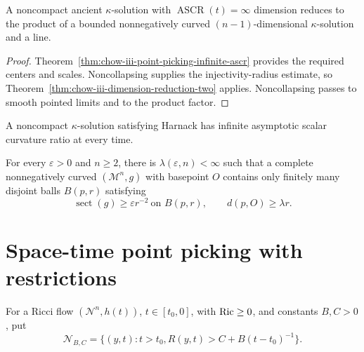 \begin{corollary}
\label{cor:chow-iii-dimension-reduction-kappa-solutions}


A noncompact ancient \(\kappa\)-solution with
\(\operatorname{ASCR}(t)=\infty\) dimension reduces to the product of a
bounded nonnegatively curved \((n-1)\)-dimensional \(\kappa\)-solution and a
line.
\end{corollary}
\begin{proof}
\sketch Theorem~\ref{thm:chow-iii-point-picking-infinite-ascr} provides the required
centers and scales.  Noncollapsing supplies the injectivity-radius estimate,
so Theorem~\ref{thm:chow-iii-dimension-reduction-two} applies.  Noncollapsing
passes to smooth pointed limits and to the product factor.
\end{proof}

\begin{remark}
\label{rem:chow-iii-kappa-solution-harnack-ascr}

A noncompact \(\kappa\)-solution satisfying Harnack has infinite asymptotic
scalar curvature ratio at every time.
\end{remark}

\begin{theorem}
\label{thm:chow-iii-finite-remote-curvature-bumps}

For every \(\varepsilon>0\) and \(n\ge2\), there is
\(\lambda(\varepsilon,n)<\infty\) such that a complete nonnegatively curved
\((\mathcal M^n,g)\) with basepoint \(O\) contains only finitely many disjoint
balls \(B(p,r)\) satisfying
\[
 \operatorname{sect}(g)\ge\varepsilon r^{-2}\ \text{on }B(p,r),
 \qquad d(p,O)\ge\lambda r.
\]
\end{theorem}

\section{Space-time point picking with restrictions}

For a Ricci flow \((\mathcal N^n,h(t))\), \(t\in[t_0,0]\), with
\(\operatorname{Ric}\ge0\), and constants \(B,C>0\), put
\[
 \mathcal N_{B,C}=\{(y,t):t>t_0, R(y,t)>C+B(t-t_0)^{-1}\}.
\]

